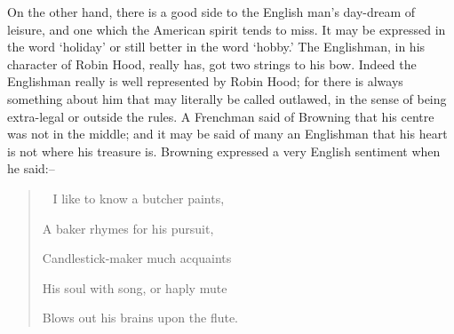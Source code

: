 \documentclass{book}
\newenvironment{mdblockquote}{%
  \begin{quotation}
    \
}{%
  \end{quotation}
}
\begin{document}
On the other hand, there is a good side to the English man’s day-dream of leisure, and one which the American spirit tends to miss. It may be expressed in the word ‘holiday’ or still better in the word ‘hobby.’ The Englishman, in his character of Robin Hood, really has, got two strings to his bow. Indeed the Englishman really is well represented by Robin Hood; for there is always something about him that may literally be called outlawed, in the sense of being extra-legal or outside the rules. A Frenchman said of Browning that his centre was not in the middle; and it may be said of many an Englishman that his heart is not where his treasure is. Browning expressed a very English sentiment when he said:–

\begin{mdblockquote}
	I like to know a butcher paints,

	A baker rhymes for his pursuit,

	Candlestick-maker much acquaints

	His soul with song, or haply mute

	Blows out his brains upon the flute.


\end{mdblockquote}
\end{document}
